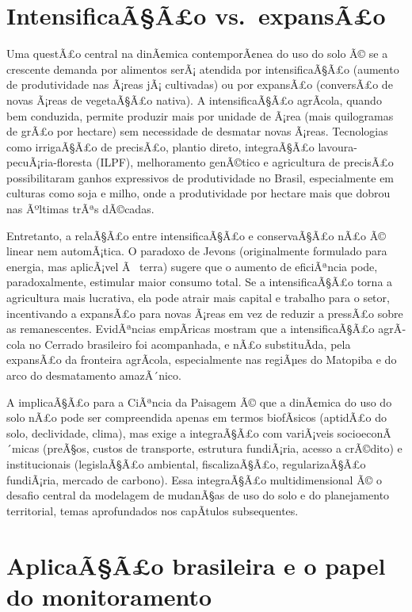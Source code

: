 \documentclass[
  portuguese,
  11pt,
  a4paper,
  open=any]{scrbook}
\begin{document}
\section{IntensificaÃ§Ã£o
vs.~expansÃ£o}\label{intensificauxe3uxe3o-vs.-expansuxe3o}

Uma questÃ£o central na dinÃ¢mica contemporÃ¢nea do uso do solo Ã© se a
crescente demanda por alimentos serÃ¡ atendida por intensificaÃ§Ã£o
(aumento de produtividade nas Ã¡reas jÃ¡ cultivadas) ou por expansÃ£o
(conversÃ£o de novas Ã¡reas de vegetaÃ§Ã£o nativa). A intensificaÃ§Ã£o
agrÃ­cola, quando bem conduzida, permite produzir mais por unidade de
Ã¡rea (mais quilogramas de grÃ£o por hectare) sem necessidade de
desmatar novas Ã¡reas. Tecnologias como irrigaÃ§Ã£o de precisÃ£o,
plantio direto, integraÃ§Ã£o lavoura-pecuÃ¡ria-floresta (ILPF),
melhoramento genÃ©tico e agricultura de precisÃ£o possibilitaram ganhos
expressivos de produtividade no Brasil, especialmente em culturas como
soja e milho, onde a produtividade por hectare mais que dobrou nas
Ãºltimas trÃªs dÃ©cadas.

Entretanto, a relaÃ§Ã£o entre intensificaÃ§Ã£o e conservaÃ§Ã£o nÃ£o Ã©
linear nem automÃ¡tica. O paradoxo de Jevons (originalmente formulado
para energia, mas aplicÃ¡vel Ã~ terra) sugere que o aumento de
eficiÃªncia pode, paradoxalmente, estimular maior consumo total. Se a
intensificaÃ§Ã£o torna a agricultura mais lucrativa, ela pode atrair
mais capital e trabalho para o setor, incentivando a expansÃ£o para
novas Ã¡reas em vez de reduzir a pressÃ£o sobre as remanescentes.
EvidÃªncias empÃ­ricas mostram que a intensificaÃ§Ã£o agrÃ­cola no Cerrado
brasileiro foi acompanhada, e nÃ£o substituÃ­da, pela expansÃ£o da
fronteira agrÃ­cola, especialmente nas regiÃµes do Matopiba e do arco do
desmatamento amazÃ´nico.

A implicaÃ§Ã£o para a CiÃªncia da Paisagem Ã© que a dinÃ¢mica do uso do
solo nÃ£o pode ser compreendida apenas em termos biofÃ­sicos (aptidÃ£o do
solo, declividade, clima), mas exige a integraÃ§Ã£o com variÃ¡veis
socioeconÃ´micas (preÃ§os, custos de transporte, estrutura fundiÃ¡ria,
acesso a crÃ©dito) e institucionais (legislaÃ§Ã£o ambiental,
fiscalizaÃ§Ã£o, regularizaÃ§Ã£o fundiÃ¡ria, mercado de carbono). Essa
integraÃ§Ã£o multidimensional Ã© o desafio central da modelagem de
mudanÃ§as de uso do solo e do planejamento territorial, temas
aprofundados nos capÃ­tulos subsequentes.

\section{AplicaÃ§Ã£o brasileira e o papel do
monitoramento}\label{aplicauxe3uxe3o-brasileira-e-o-papel-do-monitoramento}
\end{document}
